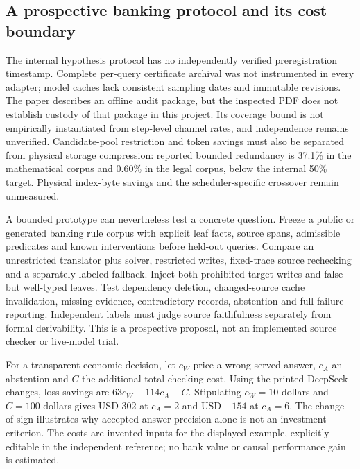 \subsection{A prospective banking protocol and its cost boundary}
\label{exec23:controlled-writes-decision}
The internal hypothesis protocol has no independently verified preregistration
timestamp. Complete per-query certificate archival was not instrumented in
every adapter; model caches lack consistent sampling dates and immutable
revisions. The paper describes an offline audit package, but the inspected
PDF does not establish custody of that package in this project. Its coverage
bound is not empirically instantiated from step-level channel rates, and
independence remains unverified. Candidate-pool restriction and token savings
must also be separated from physical storage compression: reported bounded
redundancy is 37.1\% in the mathematical corpus and 0.60\% in the legal
corpus, below the internal 50\% target. Physical index-byte savings and the
scheduler-specific crossover remain unmeasured.
\citep{exec23_controlled_writes_paper}

A bounded prototype can nevertheless test a concrete question. Freeze a
public or generated banking rule corpus with explicit leaf facts, source
spans, admissible predicates and known interventions before held-out queries.
Compare an unrestricted translator plus solver, restricted writes, fixed-trace
source rechecking and a separately labeled fallback. Inject both prohibited
target writes and false but well-typed leaves. Test dependency deletion,
changed-source cache invalidation, missing evidence, contradictory records,
abstention and full failure reporting. Independent labels must judge source
faithfulness separately from formal derivability. This is a prospective
proposal, not an implemented source checker or live-model trial.
\citep{exec23_controlled_writes_paper}

For a transparent economic decision, let $c_W$ price a wrong served answer,
$c_A$ an abstention and $C$ the additional total checking cost. Using the
printed DeepSeek changes, loss savings are $63c_W-114c_A-C$. Stipulating
$c_W=10$ dollars and $C=100$ dollars gives USD 302 at $c_A=2$ and
USD $-154$ at $c_A=6$. The change of sign illustrates why accepted-answer
precision alone is not an investment criterion. The costs are invented
inputs for the displayed example, explicitly editable in the independent
reference; no bank value or causal performance gain is estimated.
\citep{exec23_controlled_writes_reference}

